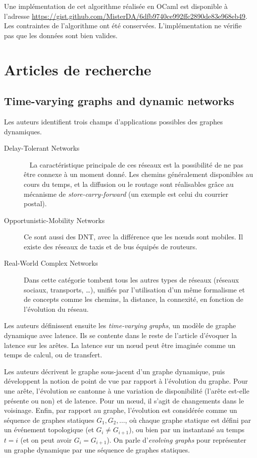 \documentclass[12pt,a4paper]{article}
\begin{document}
Une implémentation de cet algorithme réalisée en OCaml est disponible
à l'adresse
\url{https://gist.github.com/MisterDA/6dfb9740ce992ffc2890de83e968eb49}. Les
contraintes de l'algorithme ont été conservées. L'implémentation ne
vérifie pas que les données sont bien valides.

\section{Articles de recherche}
\subsection{Time-varying graphs and dynamic
  networks~\cite{casteigts2012time}}
Les auteurs identifient trois champs d'applications possibles des
graphes dynamiques.
\begin{description}
\item[Delay-Tolerant Networks]~\cite{fall2007delay} La caractéristique
  principale de ces réseaux est la possibilité de ne pas être connexe
  à un moment donné. Les chemins généralement disponibles au cours du
  temps, et la diffusion ou le routage sont réalisables grâce au
  mécanisme de \textit{store-carry-forward} (un exemple est celui du
  courrier postal).
\item[Opportunistic-Mobility Networks] Ce sont aussi des DNT, avec la
  différence que les nœuds sont mobiles. Il existe des réseaux de
  taxis et de bus équipés de routeurs.
\item[Real-World Complex Networks] Dans cette catégorie tombent tous
  les autres types de réseaux (réseaux sociaux, transports, …),
  unifiés par l'utilisation d'un même formalisme et de concepts comme
  les chemins, la distance, la connexité, en fonction de l'évolution
  du réseau.
\end{description}

Les auteurs définissent ensuite les \textit{time-varying graphs}, un
modèle de graphe dynamique avec latence. Ils se contente dans le reste
de l'article d'évoquer la latence sur les arêtes. La latence sur un
nœud peut être imaginée comme un temps de calcul, ou de transfert.

Les auteurs décrivent le graphe sous-jacent d'un graphe dynamique,
puis développent la notion de point de vue par rapport à l'évolution
du graphe. Pour une arête, l'évolution se cantonne à une variation de
disponibilité (l'arête est-elle présente ou non) et de latence. Pour
un nœud, il s'agit de changements dans le voisinage. Enfin, par
rapport au graphe, l'évolution est considérée comme un séquence de
graphes statiques \(G_1, G_2, \dots\), où chaque graphe statique est
défini par un événement topologique (et \(G_i \neq G_{i+1}\)), ou bien
par un instantané au temps \(t = i\) (et on peut avoir
\(G_i = G_{i+1}\)). On parle d'\textit{evolving graphs} pour
représenter un graphe dynamique par une séquence de graphes statiques.
\end{document}
